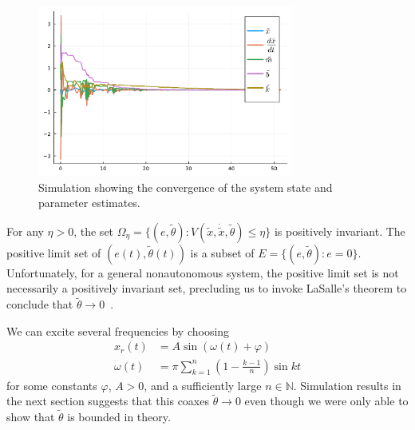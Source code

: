 \begin{figure}[h!]
  \centering
  \includegraphics[width=0.75\textwidth]{./figures/adaptationrule2.pdf}
  \caption{Simulation showing the convergence of the system state and parameter
  estimates.}
  \label{fig:adaptation}
\end{figure}

For any $\eta > 0$, the set $\Omega_\eta = \{(e, \tilde{\theta}): V(\tilde{x},
\dot{\tilde{x}}, \tilde{\theta}) \leq \eta\}$ is positively invariant. The
positive limit set of $(e(t),\tilde{\theta}(t))$ is a subset of $E = \{(e,
\tilde{\theta}): e = 0\}$. Unfortunately, for a general nonautonomous system,
the positive limit set is not necessarily a positively invariant set, precluding
us to invoke LaSalle's theorem to conclude that $\tilde{\theta} \rightarrow
0$~\cite{khalil2015nonlinear}.

%
We can excite several frequencies by choosing 
\begin{align*}
    x_r(t) &= A\sin{\left(\omega(t) + \varphi\right)} \\
    \omega(t) &= \pi\sum_{k=1}^n \left(1-\frac{k-1}{n}\right)\sin{k t}
\end{align*}
%
for some constants $\varphi$, $A > 0$, and a sufficiently large $n \in
\mathbb{N}$. Simulation results in the next section suggests that this coaxes
$\tilde{\theta} \rightarrow 0$ even though we were only able to show that
$\tilde{\theta}$ is bounded in theory. 
